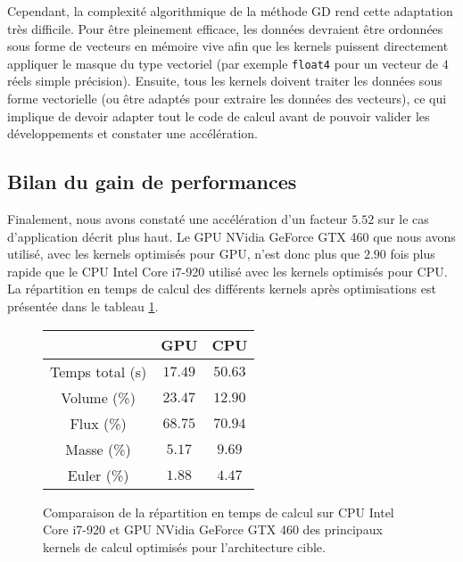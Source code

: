 Cependant, la complexité algorithmique de la méthode GD rend cette adaptation très difficile.
Pour être pleinement efficace, les données devraient être
ordonnées sous forme de vecteurs en mémoire vive afin que
les kernels puissent directement appliquer le masque du type vectoriel
(par exemple \verb|float4| pour un vecteur de $4$ réels simple précision).
Ensuite, tous les kernels doivent traiter les données sous forme
vectorielle (ou être adaptés pour extraire les données des vecteurs),
ce qui implique de devoir adapter tout le code de calcul
avant de pouvoir valider les développements et constater une
accélération.
\\



\subsection{Bilan du gain de performances}
\label{ssect:cpu_bilan}

Finalement,
nous avons constaté une accélération d'un facteur $5.52$
sur le cas d'application décrit plus haut.
Le GPU NVidia GeForce GTX 460 que nous avons utilisé, avec les kernels optimisés pour GPU,
n'est donc plus que $2.90$ fois plus rapide que le CPU Intel Core i7-920
utilisé avec les kernels optimisés pour CPU.
La répartition en temps de calcul des différents kernels après optimisations est présentée
dans le tableau \ref{tab:comp_cpu_gpu_apres}.


\begin{figure}[!h]
	\begin{center}
		\caption{
			\label{tab:comp_cpu_gpu_apres}
			Comparaison de la répartition en temps de calcul sur CPU Intel Core i7-920 et GPU NVidia GeForce GTX 460 des
			principaux kernels
			de calcul optimisés pour l'architecture cible.
		}
		
		\begin{tabular}{|c|c|c|}
			\hline
			& GPU & CPU \\ \hline\hline
			Temps total (s) & $17.49$ & $50.63$ \\	\hline
			Volume (\%) & $23.47$ & $12.90$ \\	\hline
			Flux (\%) & $68.75$ & $70.94$ \\	\hline
			Masse (\%) & $5.17$ & $9.69$ \\	\hline
			Euler (\%) & $1.88$ & $4.47$ \\	\hline
		\end{tabular}
	\end{center}
\end{figure}



